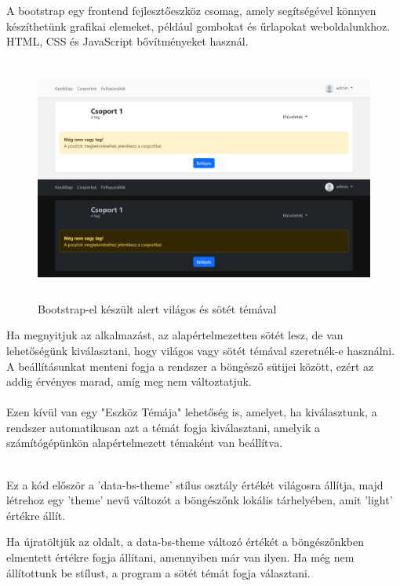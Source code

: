 \documentclass[
]{thesis-ekf}
\theoremstyle{definition}
\theoremstyle{remark}
\begin{document}
A bootstrap egy frontend fejlesztőeszköz csomag, amely segítségével könnyen készíthetünk grafikai elemeket, például gombokat és űrlapokat weboldalunkhoz. HTML, CSS és JavaScript bővítményeket használ.

\begin{figure}[H]
	\centering
	\includegraphics[width=15cm, height=8cm]{bootstrap}
	\caption{Bootstrap-el készült alert világos és sötét témával}
	\label{fig:picture}
\end{figure}
\noindent
Ha megnyitjuk az alkalmazást, az alapértelmezetten sötét lesz, de van lehetőségünk kiválasztani, hogy világos vagy sötét témával szeretnék-e használni. A beállításunkat menteni fogja a rendszer a böngésző sütijei között, ezért az addig érvényes marad, amíg meg nem változtatjuk.
\\\\
Ezen kívül van egy "Eszköz Témája" lehetőség is, amelyet, ha kiválasztunk, a rendszer automatikusan azt a témát fogja kiválasztani, amelyik a számítógépünkön alapértelmezett témaként van beállítva.
\\\\


\vspace{5mm}

Ez a kód először a 'data-bs-theme' stílus osztály értékét világosra állítja, majd létrehoz egy 'theme' nevű változót a böngészőnk lokális tárhelyében, amit 'light' értékre állít.

Ha újratöltjük az oldalt, a data-bs-theme változó értékét a böngészőnkben elmentett értékre fogja állítani, amennyiben már van ilyen. Ha még nem állítottunk be stílust, a program a sötét témát fogja választani.
\end{document}
